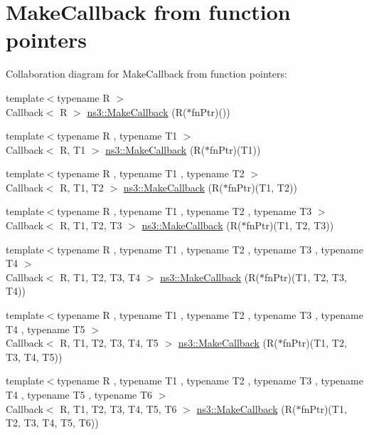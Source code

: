 \hypertarget{group__makecallbackfnptr}{}\section{Make\+Callback from function pointers}
\label{group__makecallbackfnptr}
Collaboration diagram for Make\+Callback from function pointers\+:
\begin{DoxyCompactItemize}
\item 
{\footnotesize template$<$typename R $>$ }\\Callback$<$ R $>$ \hyperlink{group__makecallbackfnptr_gaf6e243cb4b955daee7e27ee1f6104c64}{ns3\+::\+Make\+Callback} (R($\ast$fn\+Ptr)())
\item 
{\footnotesize template$<$typename R , typename T1 $>$ }\\Callback$<$ R, T1 $>$ \hyperlink{group__makecallbackfnptr_ga1bc061984b3ddd6226c3bf34c9069a52}{ns3\+::\+Make\+Callback} (R($\ast$fn\+Ptr)(T1))
\item 
{\footnotesize template$<$typename R , typename T1 , typename T2 $>$ }\\Callback$<$ R, T1, T2 $>$ \hyperlink{group__makecallbackfnptr_gae502ebabe9ba3454712b82a992fb1aff}{ns3\+::\+Make\+Callback} (R($\ast$fn\+Ptr)(T1, T2))
\item 
{\footnotesize template$<$typename R , typename T1 , typename T2 , typename T3 $>$ }\\Callback$<$ R, T1, T2, T3 $>$ \hyperlink{group__makecallbackfnptr_gabb0e24cbc38cf4bdb24345accd5bb818}{ns3\+::\+Make\+Callback} (R($\ast$fn\+Ptr)(T1, T2, T3))
\item 
{\footnotesize template$<$typename R , typename T1 , typename T2 , typename T3 , typename T4 $>$ }\\Callback$<$ R, T1, T2, T3, T4 $>$ \hyperlink{group__makecallbackfnptr_gabf9ce0b0ae59ec9092e88745adc2c157}{ns3\+::\+Make\+Callback} (R($\ast$fn\+Ptr)(T1, T2, T3, T4))
\item 
{\footnotesize template$<$typename R , typename T1 , typename T2 , typename T3 , typename T4 , typename T5 $>$ }\\Callback$<$ R, T1, T2, T3, T4, T5 $>$ \hyperlink{group__makecallbackfnptr_gaf72996cf0238cd801c6b809b1a5a1f78}{ns3\+::\+Make\+Callback} (R($\ast$fn\+Ptr)(T1, T2, T3, T4, T5))
\item 
{\footnotesize template$<$typename R , typename T1 , typename T2 , typename T3 , typename T4 , typename T5 , typename T6 $>$ }\\Callback$<$ R, T1, T2, T3, T4, T5, T6 $>$ \hyperlink{group__makecallbackfnptr_ga0011692533eabeef97b913ec6030b868}{ns3\+::\+Make\+Callback} (R($\ast$fn\+Ptr)(T1, T2, T3, T4, T5, T6))

\end{DoxyCompactItemize}
